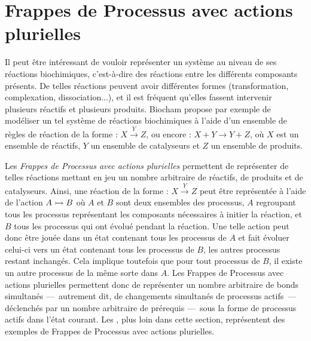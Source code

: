 \section{Frappes de Processus avec actions plurielles}

Il peut être intéressant de vouloir représenter un système au niveau de ses réactions biochimiques,
c'est-à-dire des réactions entre les différents composants présents.
De telles réactions peuvent avoir différentes formes
(transformation, complexation, dissociation...),
et il est fréquent qu'elles fassent intervenir plusieurs réactifs et plusieurs produits.
Biocham \cite{fages2004modelling}
propose par exemple de modéliser un tel système de réactions biochimiques à l'aide
d'un ensemble de règles de réaction de la forme :
$X \xrightarrow{Y} Z$,
ou encore :
$X + Y \rightarrow Y + Z$,
où $X$ est un ensemble de réactifs, $Y$ un ensemble de catalyseurs et $Z$ un ensemble de produits.

\myskip

Les \emph{Frappes de Processus avec actions plurielles} permettent de représenter de telles réactions
mettant en jeu un nombre arbitraire de réactifs, de produits et de catalyseurs.
Ainsi, une réaction de la forme : $X \xrightarrow{Y} Z$
peut être représentée à l'aide de l'action $\mbox{$A \rightarrowtail B$}$
où $A$ et $B$ sont deux ensembles des processus,
$A$ regroupant tous les processus représentant les composants nécessaires à initier la réaction,
et $B$ tous les processus qui ont évolué pendant la réaction.
Une telle action peut donc être jouée dans un état contenant tous les processus de $A$
et fait évoluer celui-ci vers un état contenant tous les processus de $B$, %
les autres processus restant inchangés. %
Cela implique toutefois que pour tout processus de $B$, il existe un autre processus de la même
sorte dans $A$.
Les Frappes de Processus avec actions plurielles permettent donc de représenter
un nombre arbitraire de bonds simultanés
---~autrement dit, de changements simultanés de processus actifs~---
déclenchés par un nombre arbitraire de prérequis
---~sous la forme de processus actifs dans l'état courant.
Les ,
plus loin dans cette section,
représentent des exemples de Frappes de Processus avec actions plurielles.

